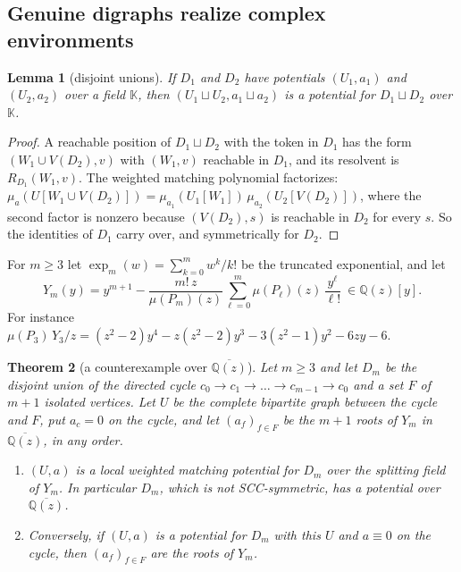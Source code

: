 \documentclass[11pt]{amsart}
\theoremstyle{plain}
\newtheorem{theorem}{Theorem}[section]
\newtheorem{lemma}[theorem]{Lemma}
\theoremstyle{definition}
\theoremstyle{remark}
\numberwithin{equation}{section}
\newcommand{\QQ}{\mathbb{Q}}
\newcommand{\Qz}{\QQ(z)}
\newcommand{\Qzbar}{\overline{\QQ(z)}}
\begin{document}
\subsection{Genuine digraphs realize complex environments}\label{ssec:counterexample}

\begin{lemma}[disjoint unions]\label{lem:disjoint-union}
If $D_1$ and $D_2$ have potentials $(U_1,a_1)$ and $(U_2,a_2)$ over a field $\mathbb K$, then $(U_1\sqcup U_2,a_1\sqcup a_2)$ is a potential for $D_1\sqcup D_2$ over $\mathbb K$.
\end{lemma}
\begin{proof}
A reachable position of $D_1\sqcup D_2$ with the token in $D_1$ has the form $(W_1\cup V(D_2),v)$ with $(W_1,v)$ reachable in $D_1$, and its resolvent is $R_{D_1}(W_1,v)$. The weighted matching polynomial factorizes: $\mu_a(U[W_1\cup V(D_2)])=\mu_{a_1}(U_1[W_1])\,\mu_{a_2}(U_2[V(D_2)])$, where the second factor is nonzero because $(V(D_2),s)$ is reachable in $D_2$ for every $s$. So the identities of $D_1$ carry over, and symmetrically for $D_2$.
\end{proof}

For $m\ge3$ let $\exp_m(w)=\sum_{k=0}^{m}w^{k}/k!$ be the truncated exponential, and let
\begin{equation}\label{eq:Ym}
Y_m(y)=y^{m+1}-\frac{m!\,z}{\mu(P_m)(z)}\sum_{\ell=0}^{m}\mu(P_\ell)(z)\,\frac{y^{\ell}}{\ell!}\ \in\Qz[y].
\end{equation}
For instance $\mu(P_3)\,Y_3/z=(z^{2}-2)y^{4}-z(z^{2}-2)y^{3}-3(z^{2}-1)y^{2}-6zy-6$.

\begin{theorem}[a counterexample over $\Qzbar$]\label{thm:complex-counterexample}
Let $m\ge3$ and let $D_m$ be the disjoint union of the directed cycle $c_0\to c_1\to\dots\to c_{m-1}\to c_0$ and a set $F$ of $m+1$ isolated vertices. Let $U$ be the complete bipartite graph between the cycle and $F$, put $a_{c}=0$ on the cycle, and let $(a_f)_{f\in F}$ be the $m+1$ roots of $Y_m$ in $\Qzbar$, in any order.
\begin{enumerate}[label=\textup{(\arabic*)}]
\item $(U,a)$ is a local weighted matching potential for $D_m$ over the splitting field of $Y_m$. In particular $D_m$, which is not SCC-symmetric, has a potential over $\Qzbar$.
\item Conversely, if $(U,a)$ is a potential for $D_m$ with this $U$ and $a\equiv0$ on the cycle, then $(a_f)_{f\in F}$ are the roots of $Y_m$.
\end{enumerate}
\end{theorem}
\end{document}
